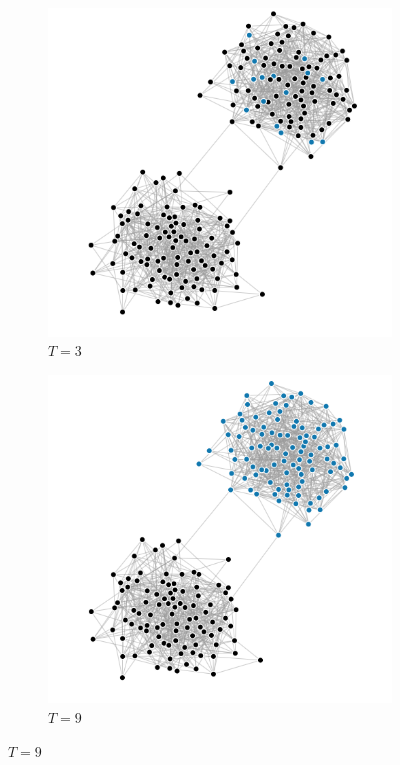 \documentclass[10pt,journal,a4paper]{IEEEtran}
\begin{document}
\begin{figure}[h]
\centering

\begin{subfigure}[b]{.5\linewidth}
\includegraphics[width=1\linewidth]{figs/split-1}
\caption{$T=3$}
\end{subfigure}%
\begin{subfigure}[b]{.5\linewidth}
\includegraphics[width=1\linewidth]{figs/split-2}
\caption{$T=9$}
\end{subfigure}


\end{figure}
\end{document}
